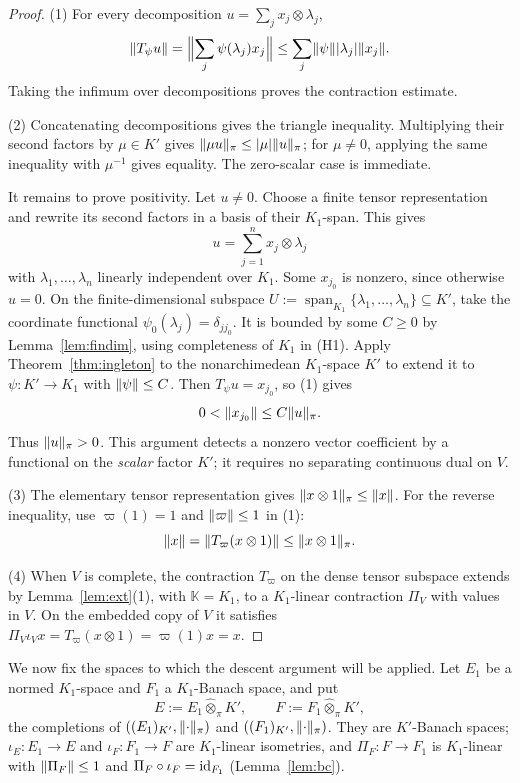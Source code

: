 \begin{proof}
(1) For every decomposition $u=\sum_jx_j\otimes\lambda_j$,
\[
\lVert T_\psi u\rVert=\Bigl\lVert\sum_j\psi(\lambda_j)x_j\Bigr\rVert
\le\sum_j\lVert \psi\rVert\lvert \lambda_j\rvert\lVert x_j\rVert.
\]
Taking the infimum over decompositions proves the contraction estimate.

(2) Concatenating decompositions gives the triangle inequality. Multiplying their second factors by
$\mu\in K'$ gives $\lVert \mu u\rVert_\pi\le\lvert \mu\rvert\lVert u\rVert_\pi$; for $\mu\ne0$, applying the same inequality with
$\mu^{-1}$ gives equality. The zero-scalar case is immediate.

It remains to prove positivity. Let $u\ne0$. Choose a finite tensor representation and rewrite its second
factors in a basis of their $K_1$\nobreakdash-span. This gives
\[
u=\sum_{j=1}^nx_j\otimes\lambda_j
\]
with $\lambda_1,\dots,\lambda_n$ linearly independent over $K_1$. Some $x_{j_0}$ is nonzero, since otherwise
$u=0$. On the finite-dimensional subspace $U:=\operatorname{span}_{K_1}\{\lambda_1,\dots,\lambda_n\}\subseteq K'$,
take the coordinate functional $\psi_0(\lambda_j)=\delta_{jj_0}$. It is bounded by some $C\ge0$ by
Lemma~\ref{lem:findim}, using completeness of $K_1$ in (H1). Apply Theorem~\ref{thm:ingleton} to the nonarchimedean
$K_1$\nobreakdash-space $K'$ to extend it to $\psi\colon K'\to K_1$ with $\lVert \psi\rVert\le C$. Then
$T_\psi u=x_{j_0}$, so (1) gives
\[
0<\lVert x_{j_0}\rVert\le C\lVert u\rVert_\pi.
\]
Thus $\lVert u\rVert_\pi>0$. This argument detects a nonzero vector coefficient by a functional on the \emph{scalar}
factor $K'$; it requires no separating continuous dual on $V$.

(3) The elementary tensor representation gives $\lVert x\otimes1\rVert_\pi\le\lVert x\rVert$. For the reverse inequality,
use $\varpi(1)=1$ and $\lVert \varpi\rVert\le1$ in (1):
\[
\lVert x\rVert=\lVert T_\varpi(x\otimes1)\rVert\le\lVert x\otimes1\rVert_\pi.
\]

(4) When $V$ is complete, the contraction $T_\varpi$ on the dense tensor subspace extends by
Lemma~\ref{lem:ext}(1), with $\mathbb K=K_1$, to a $K_1$\nobreakdash-linear contraction $\Pi_V$ with values in $V$.
On the embedded copy of $V$ it satisfies
$\Pi_V\iota_Vx=T_\varpi(x\otimes1)=\varpi(1)x=x$.
\end{proof}

We now fix the spaces to which the descent argument will be applied. Let $E_1$ be a normed $K_1$\nobreakdash-space
and $F_1$ a $K_1$\nobreakdash-Banach space, and put
\[
E:=E_1\widehat\otimes_\pi K',\qquad F:=F_1\widehat\otimes_\pi K',
\]
the completions of $((E_1)_{K'},\lVert \cdot\rVert_\pi)$ and $((F_1)_{K'},\lVert \cdot\rVert_\pi)$. They are $K'$\nobreakdash-Banach spaces;
$\iota_E\colon E_1\to E$ and $\iota_F\colon F_1\to F$ are $K_1$\nobreakdash-linear isometries, and $\Pi_F\colon F\to F_1$ is $K_1$\nobreakdash-linear
with $\lVert \Pi_F\rVert\le1$ and $\Pi_F\circ\iota_F=\mathrm{id}_{F_1}$ (Lemma~\ref{lem:bc}).

